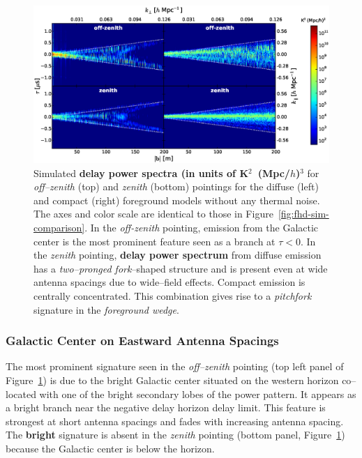 \documentclass[preprint2,iop,numberedappendix,twocolappendix,appendixfloats]{emulateapj}
\begin{document}
\begin{figure}[htb]
\centering
\includegraphics[width=\linewidth]{figure7.eps}
\caption{Simulated {\bf delay power spectra (in units of K$^2$~(Mpc/$h$)$^3$} for {\it off--zenith} (top) and {\it zenith} (bottom) pointings for the diffuse (left) and compact (right) foreground models without any thermal noise. The axes and color scale are identical to those in Figure~\ref{fig:fhd-sim-comparison}. In the {\it off-zenith} pointing, emission from the Galactic center is the most prominent feature seen as a branch at $\tau<0$. In the {\it zenith} pointing, {\bf delay power spectrum} from diffuse emission has a {\it two--pronged fork}--shaped structure and is present even at wide antenna spacings due to wide--field effects. Compact emission is centrally concentrated. This combination gives rise to a {\it pitchfork} signature in the {\it foreground wedge}. \label{fig:noiseless-dsm-csm-delay-spectrum}}
\end{figure}

\subsubsection{Galactic Center on Eastward Antenna Spacings}\label{sec:GC-east}

The most prominent signature seen in the {\it off--zenith} pointing (top left panel of Figure~\ref{fig:noiseless-dsm-csm-delay-spectrum}) is due to the bright Galactic center situated on the western horizon co--located with one of the bright secondary lobes of the power pattern. It appears as a bright branch near the negative delay horizon delay limit. This feature is strongest at short antenna spacings and fades with increasing antenna spacing. The {\bf bright} signature is absent in the {\it zenith} pointing (bottom panel, Figure~\ref{fig:noiseless-dsm-csm-delay-spectrum}) because the Galactic center is below the horizon. 
\end{document}
